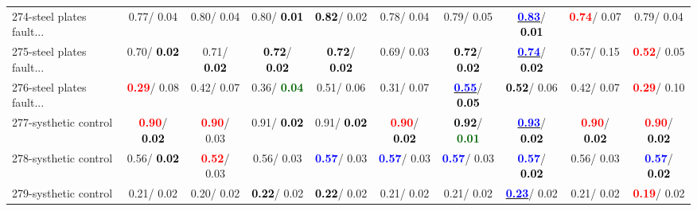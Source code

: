 \begin{table}[h]
\begin{center}
{\begin{tabular}{lc|c|c|c|c|c|c|c|c}
274-steel plates fault... &   0.77/  0.04 &   0.80/  0.04 &   0.80/\textcolor{black}{\textbf{  0.01}} & \textcolor{black}{\textbf{  0.82}}/  0.02 &   0.78/  0.04 &   0.79/  0.05 & \underline{\textcolor{blue}{\textbf{  0.83}}}/\textcolor{black}{\textbf{  0.01}} & \textcolor{red}{\textbf{  0.74}}/  0.07 &   0.79/  0.04 \\
275-steel plates fault... &   0.70/\textcolor{black}{\textbf{  0.02}} &   0.71/\textcolor{black}{\textbf{  0.02}} & \textcolor{black}{\textbf{  0.72}}/\textcolor{black}{\textbf{  0.02}} & \textcolor{black}{\textbf{  0.72}}/\textcolor{black}{\textbf{  0.02}} &   0.69/  0.03 & \textcolor{black}{\textbf{  0.72}}/\textcolor{black}{\textbf{  0.02}} & \underline{\textcolor{blue}{\textbf{  0.74}}}/\textcolor{black}{\textbf{  0.02}} &   0.57/  0.15 & \textcolor{red}{\textbf{  0.52}}/  0.05 \\
276-steel plates fault... & \textcolor{red}{\textbf{  0.29}}/  0.08 &   0.42/  0.07 &   0.36/\textcolor{darkgreen}{\textbf{  0.04}} &   0.51/  0.06 &   0.31/  0.07 & \underline{\textcolor{blue}{\textbf{  0.55}}}/\textcolor{black}{\textbf{  0.05}} & \textcolor{black}{\textbf{  0.52}}/  0.06 &   0.42/  0.07 & \textcolor{red}{\textbf{  0.29}}/  0.10 \\
277-systhetic control & \textcolor{red}{\textbf{  0.90}}/\textcolor{black}{\textbf{  0.02}} & \textcolor{red}{\textbf{  0.90}}/  0.03 &   0.91/\textcolor{black}{\textbf{  0.02}} &   0.91/\textcolor{black}{\textbf{  0.02}} & \textcolor{red}{\textbf{  0.90}}/\textcolor{black}{\textbf{  0.02}} & \textcolor{black}{\textbf{  0.92}}/\textcolor{darkgreen}{\textbf{  0.01}} & \underline{\textcolor{blue}{\textbf{  0.93}}}/\textcolor{black}{\textbf{  0.02}} & \textcolor{red}{\textbf{  0.90}}/\textcolor{black}{\textbf{  0.02}} & \textcolor{red}{\textbf{  0.90}}/\textcolor{black}{\textbf{  0.02}} \\ \hline
278-systhetic control &   0.56/\textcolor{black}{\textbf{  0.02}} & \textcolor{red}{\textbf{  0.52}}/  0.03 &   0.56/  0.03 & \textcolor{blue}{\textbf{  0.57}}/  0.03 & \textcolor{blue}{\textbf{  0.57}}/  0.03 & \textcolor{blue}{\textbf{  0.57}}/  0.03 & \textcolor{blue}{\textbf{  0.57}}/\textcolor{black}{\textbf{  0.02}} &   0.56/  0.03 & \textcolor{blue}{\textbf{  0.57}}/\textcolor{black}{\textbf{  0.02}} \\
279-systhetic control &   0.21/  0.02 &   0.20/  0.02 & \textcolor{black}{\textbf{  0.22}}/  0.02 & \textcolor{black}{\textbf{  0.22}}/  0.02 &   0.21/  0.02 &   0.21/  0.02 & \underline{\textcolor{blue}{\textbf{  0.23}}}/  0.02 &   0.21/  0.02 & \textcolor{red}{\textbf{  0.19}}/  0.02 \\

\end{tabular}}
\end{center}
\end{table}
